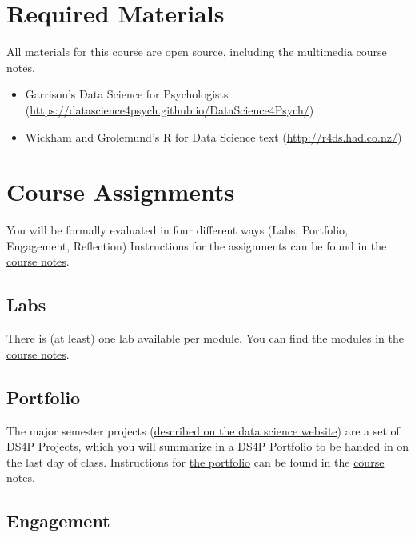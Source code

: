 \documentclass[
]{book}
\providecommand{\tightlist}{%
  \setlength{\itemsep}{0pt}\setlength{\parskip}{0pt}}
\begin{document}
\section*{Required Materials}\label{required-materials-2}


All materials for this course are open source, including the multimedia course notes.

\begin{itemize}
\tightlist
\item
  Garrison's Data Science for Psychologists (\url{https://datascience4psych.github.io/DataScience4Psych/})
\item
  Wickham and Grolemund's R for Data Science text (\url{http://r4ds.had.co.nz/})
\end{itemize}

\section*{Course Assignments}\label{course-assignments-2}


You will be formally evaluated in four different ways (Labs, Portfolio, Engagement, Reflection) Instructions for the assignments can be found in the \href{https://datascience4psych.github.io/DataScience4Psych/}{course notes}.

\subsection*{Labs}\label{labs}


There is (at least) one lab available per module. You can find the modules in the \href{https://datascience4psych.github.io/DataScience4Psych/}{course notes}.

\subsection*{Portfolio}\label{portfolio}


The major semester projects (\href{https://datascience4psych.github.io/DataScience4Psych/guidance.html\#portfolio}{described on the data science website}) are a set of DS4P Projects, which you will summarize in a DS4P Portfolio to be handed in on the last day of class. Instructions for \href{https://datascience4psych.github.io/DataScience4Psych/guidance.html\#portfolio}{the portfolio} can be found in the \href{https://datascience4psych.github.io/DataScience4Psych/}{course notes}.

\subsection*{Engagement}\label{engagement}
\end{document}
